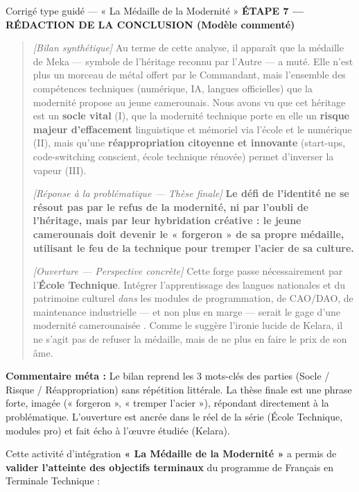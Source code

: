 \documentclass[11pt]{article}
\newcounter{popsec}
\newcounter{popsub}
\newcommand{\courssub}[1]{%
  \stepcounter{popsub}%
  \par\vspace{9pt}\noindent{\popxbold\fontsize{11.5}{13}\selectfont\color{popink}{\color{poporange}\thepopsec.\thepopsub}\hspace{6pt}#1}\par\nopagebreak\vspace{4pt}
}
\begin{document}
\begin{exoresolu}{Corrigé type guidé — « La Médaille de la Modernité »}
\textbf{ÉTAPE 7 — RÉDACTION DE LA CONCLUSION (Modèle commenté)}

\begin{quote}
    \textit{[Bilan synthétique]} Au terme de cette analyse, il apparaît que la médaille de Meka — symbole de l'héritage reconnu par l'Autre — a muté. Elle n'est plus un morceau de métal offert par le Commandant, mais l'ensemble des compétences techniques (numérique, IA, langues officielles) que la modernité propose au jeune camerounais. Nous avons vu que cet héritage est un \textbf{socle vital} (I), que la modernité technique porte en elle un \textbf{risque majeur d'effacement} linguistique et mémoriel via l'école et le numérique (II), mais qu'une \textbf{réappropriation citoyenne et innovante} (start-ups, code-switching conscient, école technique rénovée) permet d'inverser la vapeur (III).
    
    \textit{[Réponse à la problématique — Thèse finale]} \textbf{Le défi de l'identité ne se résout pas par le refus de la modernité, ni par l'oubli de l'héritage, mais par leur hybridation créative : le jeune camerounais doit devenir le « forgeron » de sa propre médaille, utilisant le feu de la technique pour tremper l'acier de sa culture.}
    
    \textit{[Ouverture — Perspective concrète]} Cette forge passe nécessairement par l'\textbf{École Technique}. Intégrer l'apprentissage des langues nationales et du patrimoine culturel \emph{dans} les modules de programmation, de CAO/DAO, de maintenance industrielle — et non plus en marge — serait le gage d'une modernité \og camerounaisée \fg{}. Comme le suggère l'ironie lucide de Kelara, il ne s'agit pas de refuser la médaille, mais de ne plus en faire le prix de son âme.
\end{quote}

\noindent \textbf{Commentaire méta :} Le bilan reprend les 3 mots-clés des parties (Socle / Risque / Réappropriation) sans répétition littérale. La thèse finale est une phrase forte, imagée (« forgeron », « tremper l'acier »), répondant directement à la problématique. L'ouverture est ancrée dans le réel de la série (École Technique, modules pro) et fait écho à l'œuvre étudiée (Kelara).
\end{exoresolu}

\courssub{Bilan de l'activité}
\noindent Cette activité d'intégration \textbf{« La Médaille de la Modernité »} a permis de \textbf{valider l'atteinte des objectifs terminaux} du programme de Français en Terminale Technique :
\end{document}
